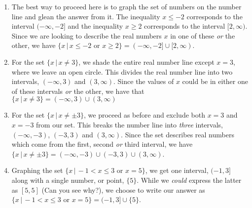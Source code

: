 {
\begin{enumerate}

\item  The best way to proceed here is to graph the set of numbers on the number line and glean the answer from it.  The inequality $x \leq -2$ corresponds to the interval $(-\infty, -2]$ and the inequality $x \geq 2$ corresponds to the interval $[2, \infty)$.  Since we are looking to describe the real numbers $x$ in one of these \textit{or} the other, we have $\{ x \, | \, x \leq -2 \, \, \text{or} \, \,  x \geq 2 \} = (-\infty, -2] \cup [2, \infty)$.

\mfigure{.54}{The set $(-\infty, -2] \cup [2, \infty)$}{fig:eg1-1}{figures/CartesianPlane-17}

\item For the set $\{ x \, | \, x \neq 3 \}$, we shade the entire real number line except $x=3$, where we leave an open circle.  This divides the real number line into two intervals, $(-\infty, 3)$ and $(3,\infty)$.  Since the values of $x$ could be in either one of these intervals \textit{or} the other, we have that $\{ x \, | \, x \neq 3 \} = (-\infty, 3) \cup (3,\infty)$
 

\item  For the set $\{ x \, | \, x \neq \pm 3 \}$, we proceed as before and exclude both $x=3$ and $x=-3$ from our set.  This breaks the number line into \textit{three} intervals, $(-\infty, -3)$, $(-3,3)$ and $(3, \infty)$.   Since the set describes real numbers which come from the first, second \textit{or} third interval, we have $\{ x \, | \, x \neq \pm 3 \} = (-\infty, -3) \cup (-3,3) \cup (3, \infty)$.



\item  Graphing the set $\{ x \, | \, -1 < x \leq 3 \,\, \text{or} \,\, x = 5\}$, we get one interval, $(-1,3]$ along with a single number, or point, $\{ 5\}$.  While we \textit{could} express the latter as $[5,5]$ (Can you see why?), we choose to write our answer as $\{ x \, | \, -1 < x \leq 3 \,\, \text{or} \,\, x = 5\} = (-1,3] \cup \{ 5\}$.

\mfigure{.3}{The set $(-1,3] \cup \{ 5\}$}{fig:eg1-4}{figures/CartesianPlane-20}
\end{enumerate}
}


